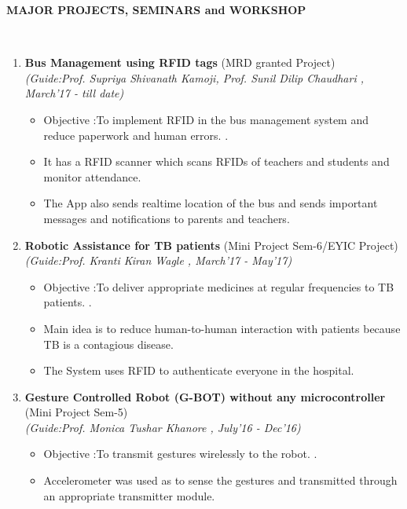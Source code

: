 \documentclass[a4paper,10pt]{article}
\newcommand{\isep}{-2 pt}
\newcommand{\lsep}{-0.5cm}
\newcommand{\resheading}[1]{{\small \colorbox{mygrey}{\begin{minipage}{0.975\textwidth}{\textbf{#1 \vphantom{p\^{E}}}}\end{minipage}}}}
\begin{document}
\resheading{\textbf{MAJOR PROJECTS, SEMINARS and WORKSHOP} }\\[\lsep]
\begin{enumerate}
\item \textbf{Bus Management using RFID tags
} (MRD granted Project) \\
 \emph{(Guide:Prof. Supriya Shivanath Kamoji, Prof. Sunil Dilip Chaudhari
, March'17 - till date)} \\[-0.6cm]
	\begin{itemize}\itemsep \isep
	\item Objective :To implement RFID in the bus management system and reduce paperwork and human errors.
.
	\item It has a RFID scanner which scans RFIDs of teachers and students and monitor attendance.

	\item The App also sends realtime location of the bus and sends important messages and notifications to parents and teachers.
	\end{itemize}
\item \textbf{Robotic Assistance for TB patients
} (Mini Project Sem-6/EYIC Project) \\
 \emph{(Guide:Prof. Kranti Kiran Wagle
, March'17 - May'17)} \\[-0.6cm]
	\begin{itemize}\itemsep \isep
	\item Objective :To deliver appropriate medicines at regular frequencies to TB patients.
.
	\item Main idea is to reduce human-to-human interaction with patients because TB is a contagious disease.

	\item The System uses RFID to authenticate everyone in the hospital.

	\end{itemize}

\item \textbf{Gesture Controlled Robot (G-BOT) without any microcontroller
} (Mini Project Sem-5) \\
 \emph{(Guide:Prof. Monica Tushar Khanore
, July'16 - Dec'16)} \\[-0.6cm]
	\begin{itemize}\itemsep \isep
	\item Objective :To transmit gestures wirelessly to the robot.
.
	\item Accelerometer was used as to sense the gestures and transmitted through an appropriate transmitter module.
	\end{itemize}


\end{enumerate}
\end{document}
